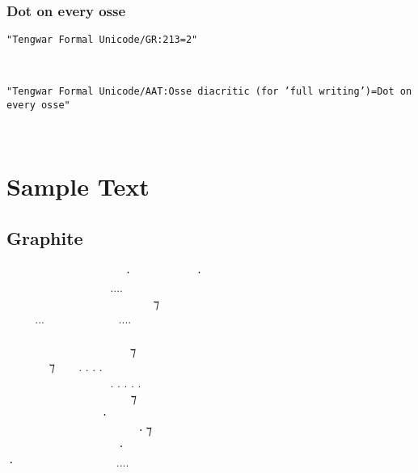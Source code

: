 \documentclass[11pt,a4paper]{article}
\begin{document}
\formalAATosseambiguous  

\subsubsection{Dot on every osse}

\texttt{"Tengwar Formal Unicode/GR:213=2"}

\formalGRosseevery  

\noindent \texttt{"Tengwar Formal Unicode/AAT:Osse diacritic (for 'full writing')=Dot on every osse"}

\formalAATosseevery  


\newpage

\section{Sample Text}

\subsection{Graphite}
\formalGR
  ‍   ⸱‍  ‍ ⸱ \\
    ‍....  ‍  \\
  ‍   ‍ ‍ ⁊ ‍  \\
...  ....   \\
         ‍ \\
 ‍ ‍‍   ⁊  ‍ ‍ \\
 ‍ ⁊  . . . .  ‍ ‍‍   \\
   ‍ . . . . . ‍ ‍   \\
      ⁊    \\
   ‍⸱‍   ‍  \\
     ‍⸱ ⁊  ‍ \\
    ⸱    \\
⸱  ‍  .... ‍‍    \\
\end{document}

